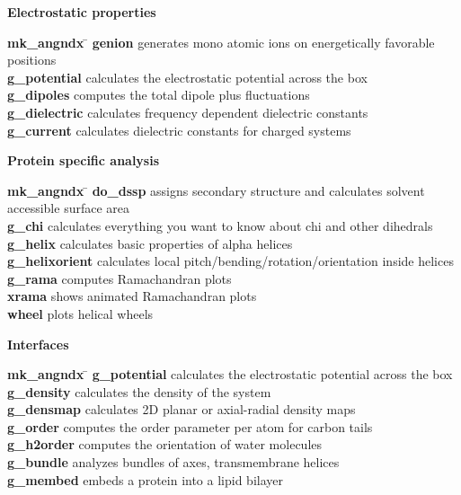 \begin{description}
\item {\large\bf Electrostatic properties}
\vspace{-2ex}\begin{tabbing}
{\bf mk\_angndx} \= \kill
{\bf genion} \> generates mono atomic ions on energetically favorable positions \\
{\bf g\_potential} \> calculates the electrostatic potential across the box \\
{\bf g\_dipoles} \> computes the total dipole plus fluctuations \\
{\bf g\_dielectric} \> calculates frequency dependent dielectric constants \\
{\bf g\_current} \> calculates dielectric constants for charged systems \\
\end{tabbing}\vspace{-2ex}

\item {\large\bf Protein specific analysis}
\vspace{-2ex}\begin{tabbing}
{\bf mk\_angndx} \= \kill
{\bf do\_dssp} \> assigns secondary structure and calculates solvent accessible surface area \\
{\bf g\_chi} \> calculates everything you want to know about chi and other dihedrals \\
{\bf g\_helix} \> calculates basic properties of alpha helices \\
{\bf g\_helixorient} \> calculates local pitch/bending/rotation/orientation inside helices \\
{\bf g\_rama} \> computes Ramachandran plots \\
{\bf xrama} \> shows animated Ramachandran plots \\
{\bf wheel} \> plots helical wheels \\
\end{tabbing}\vspace{-2ex}

\item {\large\bf Interfaces}
\vspace{-2ex}\begin{tabbing}
{\bf mk\_angndx} \= \kill
{\bf g\_potential} \> calculates the electrostatic potential across the box \\
{\bf g\_density} \> calculates the density of the system \\
{\bf g\_densmap} \> calculates 2D planar or axial-radial density maps \\
{\bf g\_order} \> computes the order parameter per atom for carbon tails \\
{\bf g\_h2order} \> computes the orientation of water molecules \\
{\bf g\_bundle} \> analyzes bundles of axes, {\eg} transmembrane helices \\
{\bf g\_membed} \> embeds a protein into a lipid bilayer \\
\end{tabbing}\vspace{-2ex}


\end{description}
